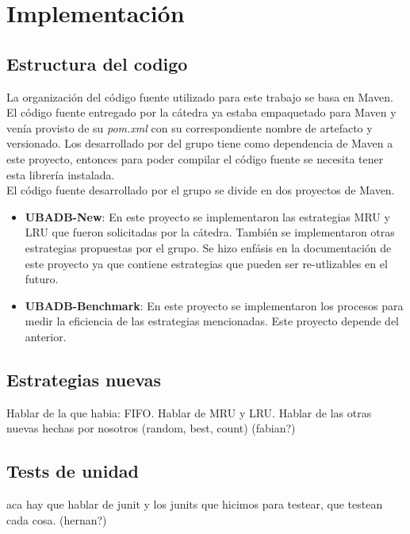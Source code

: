 \section{Implementaci\'on}

\subsection{Estructura del codigo}
La organizaci\'on del c\'odigo fuente utilizado para este trabajo se basa en Maven. El
c\'odigo fuente entregado por la c\'atedra ya estaba empaquetado para Maven y ven\'ia
provisto de su \textit{pom.xml} con su correspondiente nombre de artefacto y versionado.
Los desarrollado por del grupo tiene como dependencia de Maven a este proyecto, entonces 
para poder compilar el c\'odigo fuente se necesita tener esta librer\'ia instalada.\\
El c\'odigo fuente desarrollado por el grupo se divide en dos proyectos de Maven.
\begin{itemize}
\item \textbf{UBADB-New}: En este proyecto se implementaron las estrategias MRU y LRU 
que fueron solicitadas por la c\'atedra. Tambi\'en se implementaron otras estrategias 
propuestas por el grupo. Se hizo enf\'asis en la documentaci\'on de este proyecto ya
que contiene estrategias que pueden ser re-utlizables en el futuro.
\item \textbf{UBADB-Benchmark}: En este proyecto se implementaron los procesos para
medir la eficiencia de las estrategias mencionadas. Este proyecto depende del anterior.
\end{itemize}
  
   
\subsection{Estrategias nuevas}
Hablar de la que habia: FIFO.
Hablar de MRU y LRU. Hablar de las otras nuevas hechas por nosotros (random, best, count) 
(fabian?)

\subsection{Tests de unidad}
aca hay que hablar de junit y los junits que hicimos para testear, que testean cada cosa.
(hernan?)

